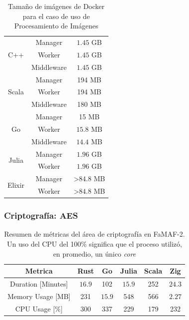 \documentclass[11pt]{article}
\let\Oldsubsubsection\subsubsection
\renewcommand{\subsubsection}{\FloatBarrier\Oldsubsubsection}
\newcommand{\english}[1]{\textit{#1}}
\begin{document}
\begin{table}[H]
\centering
\begin{tabular}{|ccc|}
\hline
\multicolumn{1}{|c|}{\multirow{3}{*}{C++}} & \multicolumn{1}{c|}{Manager} & $1.45$ GB \\ \cline{2-3} 
\multicolumn{1}{|c|}{} & \multicolumn{1}{c|}{Worker} & $1.45$ GB \\ \cline{2-3} 
\multicolumn{1}{|c|}{} & \multicolumn{1}{c|}{Middleware} & $1.45$ GB \\ \hline
\multicolumn{1}{|c|}{\multirow{3}{*}{Scala}} & \multicolumn{1}{c|}{Manager} & 194 MB \\ \cline{2-3} 
\multicolumn{1}{|c|}{} & \multicolumn{1}{c|}{Worker} & 194 MB \\ \cline{2-3} 
\multicolumn{1}{|c|}{} & \multicolumn{1}{c|}{Middleware} & 180 MB \\ \hline
\multicolumn{1}{|c|}{\multirow{3}{*}{Go}} & \multicolumn{1}{c|}{Manager} & 15 MB \\ \cline{2-3} 
\multicolumn{1}{|c|}{} & \multicolumn{1}{c|}{Worker} & $15.8$ MB \\ \cline{2-3} 
\multicolumn{1}{|c|}{} & \multicolumn{1}{c|}{Middleware} & $14.4$ MB \\ \hline
\multicolumn{1}{|c|}{\multirow{2}{*}{Julia}} & \multicolumn{1}{c|}{Manager} & $1.96$ GB \\ \cline{2-3} 
\multicolumn{1}{|c|}{} & \multicolumn{1}{c|}{Worker} & $1.96$ GB \\ \hline
\multicolumn{1}{|c|}{\multirow{2}{*}{Elixir}} & \multicolumn{1}{c|}{Manager} & \textgreater{}$84.8$ MB \\ \cline{2-3} 
\multicolumn{1}{|c|}{} & \multicolumn{1}{c|}{Worker} & \textgreater{}$84.8$ MB \\ \hline
\end{tabular}
\caption{Tamaño de imágenes de Docker para el caso de uso de Procesamiento de Imágenes}
\label{tab:ip:image_sizes}
\end{table}

\subsubsection{Criptografía: AES} \label{sec:anex:metrics:aes}

\begin{table}[H]
\centering
\begin{tabular}{|c|c|c|c|c|c|}
\hline
Metrica & Rust & Go & Julia & Scala & Zig \\ \hline
Duration [Minutes] & $16.9$ & 102 & $15.9$ & 252 & $24.3$ \\ \hline
Memory Usage [MB] & 231 & $15.9$ & 548 & 566 & $2.27$ \\ \hline
CPU Usage [\%] & 300 & 337 & 229 & 179 & 232 \\ \hline
\end{tabular}
\caption{Resumen de métricas del área de criptografía en FaMAF-2. Un uso del CPU del 100\% significa que el proceso utilizó, en promedio, un único \english{core}}
\label{tab:aes:famaf_2}
\end{table}
\end{document}

